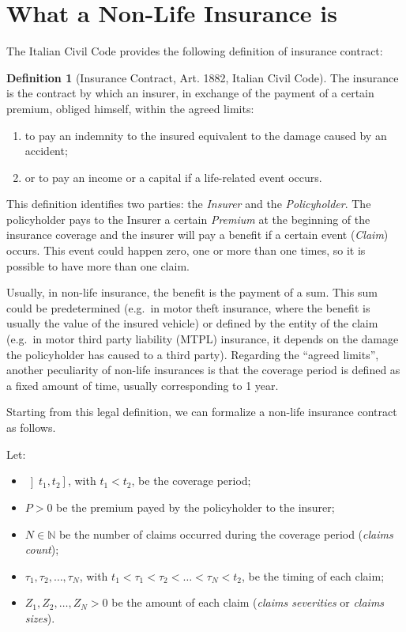 \documentclass[a4paper, nobind]{templates/ociamthesis}
\theoremstyle{definition}
\newtheorem{definition}{Definition}[chapter]
\theoremstyle{definition}
\theoremstyle{definition}
\theoremstyle{remark}
\begin{document}
\hypertarget{chap:non-life-ins}{%
\section{What a Non-Life Insurance is}\label{chap:non-life-ins}}

The Italian Civil Code provides the following definition of insurance contract:

\begin{definition}[Insurance Contract, Art. 1882, Italian Civil Code]
\label{def:ins-contr} \iffalse (Insurance Contract, Art. 1882, Italian Civil Code) \fi{} The insurance is the contract by which an insurer, in exchange of the payment of a certain premium, obliged himself, within the agreed limits:

\begin{enumerate}[noitemsep]
  \item to pay an indemnity to the insured equivalent to the damage caused by an accident;
  \item or to pay an income or a capital if a life-related event occurs.
\end{enumerate}
\end{definition}

This definition identifies two parties: the \emph{Insurer} and the \emph{Policyholder}. The policyholder pays to the Insurer a certain \emph{Premium} at the beginning of the insurance coverage and the insurer will pay a benefit if a certain event (\emph{Claim}) occurs. This event could happen zero, one or more than one times, so it is possible to have more than one claim.

Usually, in non-life insurance, the benefit is the payment of a sum. This sum could be predetermined (e.g.~in motor theft insurance, where the benefit is usually the value of the insured vehicle) or defined by the entity of the claim (e.g.~in motor third party liability (MTPL) insurance, it depends on the damage the policyholder has caused to a third party). Regarding the ``agreed limits'', another peculiarity of non-life insurances is that the coverage period is defined as a fixed amount of time, usually corresponding to 1 year.

Starting from this legal definition, we can formalize a non-life insurance contract as follows.

Let:

\begin{itemize}
\item
  \(\left]t_1, t_2\right]\), with \(t_1<t_2\), be the coverage period;
\item
  \(P>0\) be the premium payed by the policyholder to the insurer;
\item
  \(N\in\mathbb{N}\) be the number of claims occurred during the coverage period (\emph{claims count});
\item
  \(\tau_1, \tau_2, \dots, \tau_N\), with \(t_1<\tau_1< \tau_2 < \dots < \tau_N<t_2\), be the timing of each claim;
\item
  \(Z_1, Z_2, \dots, Z_N > 0\) be the amount of each claim (\emph{claims severities} or \emph{claims sizes}).
\end{itemize}
\end{document}
